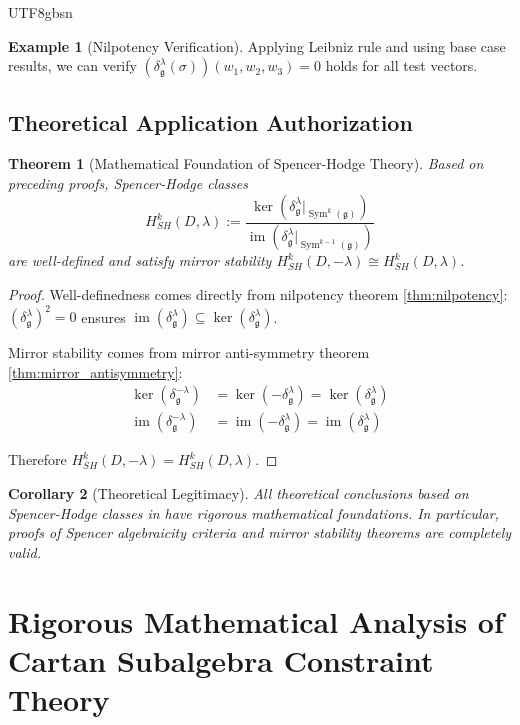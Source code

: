 \documentclass[a4paper,12pt]{extarticle}
\newtheorem{theorem}{Theorem}[section]
\newtheorem{corollary}[theorem]{Corollary}
\theoremstyle{definition}
\newtheorem{example}{Example}[section]
\begin{document}
\begin{CJK}{UTF8}{gbsn}
\begin{example}[Nilpotency Verification]
Applying Leibniz rule and using base case results, we can verify $(\delta^\lambda_\mathfrak{g}(\sigma))(w_1, w_2, w_3) = 0$ holds for all test vectors.
\end{example}

\subsection{Theoretical Application Authorization}
\label{subsec:theoretical_application_authorization}

\begin{theorem}[Mathematical Foundation of Spencer-Hodge Theory]
\label{thm:spencer_hodge_foundation}
Based on preceding proofs, Spencer-Hodge classes
$$H^k_{SH}(D,\lambda) := \frac{\ker(\delta^\lambda_\mathfrak{g}|_{\operatorname{Sym}^k(\mathfrak{g})})}{\operatorname{im}(\delta^\lambda_\mathfrak{g}|_{\operatorname{Sym}^{k-1}(\mathfrak{g})})}$$
are well-defined and satisfy mirror stability $H^k_{SH}(D,-\lambda) \cong H^k_{SH}(D,\lambda)$.
\end{theorem}

\begin{proof}
Well-definedness comes directly from nilpotency theorem \ref{thm:nilpotency}: $(\delta^\lambda_\mathfrak{g})^2 = 0$ ensures $\operatorname{im}(\delta^\lambda_\mathfrak{g}) \subseteq \ker(\delta^\lambda_\mathfrak{g})$.

Mirror stability comes from mirror anti-symmetry theorem \ref{thm:mirror_antisymmetry}:
\begin{align}
\ker(\delta^{-\lambda}_\mathfrak{g}) &= \ker(-\delta^\lambda_\mathfrak{g}) = \ker(\delta^\lambda_\mathfrak{g}) \\
\operatorname{im}(\delta^{-\lambda}_\mathfrak{g}) &= \operatorname{im}(-\delta^\lambda_\mathfrak{g}) = \operatorname{im}(\delta^\lambda_\mathfrak{g})
\end{align}

Therefore $H^k_{SH}(D,-\lambda) = H^k_{SH}(D,\lambda)$.
\end{proof}

\begin{corollary}[Theoretical Legitimacy]
\label{cor:theoretical_legitimacy}
All theoretical conclusions based on Spencer-Hodge classes in \cite{zheng2025mirror} have rigorous mathematical foundations. In particular, proofs of Spencer algebraicity criteria and mirror stability theorems are completely valid.
\end{corollary}

\section{Rigorous Mathematical Analysis of Cartan Subalgebra Constraint Theory}
\label{appendix:cartan_constraint_rigorous_analysis}


\end{CJK}
\end{document}
